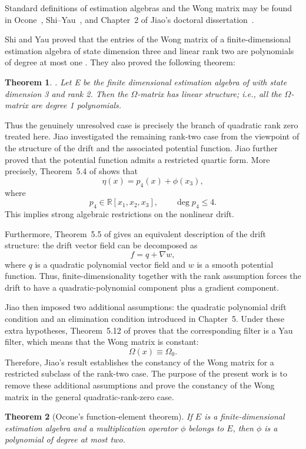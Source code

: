\documentclass[11pt,a4paper]{article}
\numberwithin{equation}{section}
\theoremstyle{journalplain}
\newtheorem{theorem}{Theorem}[section]
\theoremstyle{journaldef}
\begin{document}
Standard definitions of estimation algebras and the Wong matrix may be found in
Ocone~\cite{Ocone1981}, Shi--Yau~\cite{ShiYau2017}, and Chapter~2 of Jiao's
doctoral dissertation~\cite[pp.~21--26]{Jiao2022}.

Shi and Yau proved that the entries of the Wong matrix of a finite-dimensional
estimation algebra of state dimension three and linear rank two are
polynomials of degree at most one
\cite[Theorems 3.4 and 3.10]{ShiYau2017}.  They also proved the following theorem:
\begin{theorem}\cite[Theorem 1.1, p.~2178]{ShiYau2020}.  
    Let E be the finite dimensional estimation algebra of with
state dimension 3 and rank 2. Then the $\Omega$-matrix has linear structure; i.e., all the
$\Omega$-matrix are degree 1 polynomials.
\end{theorem}
Thus the genuinely unresolved case
is precisely the branch of quadratic rank zero treated here. 
Jiao investigated the remaining rank-two case from the viewpoint of the
structure of the drift and the associated potential function.
Jiao further proved that the
potential function admits a restricted quartic form. More precisely,
Theorem~5.4 of \cite{Jiao2022} shows that
\[
\eta(x)=p_4(x)+\phi(x_3),
\]
where
\[
p_4\in\mathbb R[x_1,x_2,x_3],
\qquad
\deg p_4\le4 .
\]
This implies strong algebraic restrictions on the nonlinear drift.

Furthermore, Theorem~5.5 of \cite{Jiao2022} gives an equivalent
description of the drift structure: the drift vector field can be
decomposed as
\[
f=q+\nabla w,
\]
where \(q\) is a quadratic polynomial vector field and \(w\) is a smooth
potential function. Thus, finite-dimensionality together with the rank
assumption forces the drift to have a quadratic-polynomial component
plus a gradient component.

Jiao then imposed two additional assumptions: the quadratic polynomial
drift condition and an elimination condition introduced in Chapter~5.
Under these extra hypotheses, Theorem~5.12 of \cite{Jiao2022} proves that
the corresponding filter is a Yau filter, which means that the Wong
matrix is constant:
\[
\Omega(x)\equiv\Omega_0 .
\]
Therefore, Jiao's result establishes the constancy of the Wong matrix
for a restricted subclass of the rank-two case. The purpose of the
present work is to remove these additional assumptions and prove the
constancy of the Wong matrix in the general quadratic-rank-zero case.


\begin{theorem}[Ocone's function-element theorem]\label{thm:ocone}
If $E$ is a finite-dimensional estimation algebra and a multiplication
operator $\phi$ belongs to $E$, then $\phi$ is a polynomial of degree at most
two.
\end{theorem}
\end{document}
